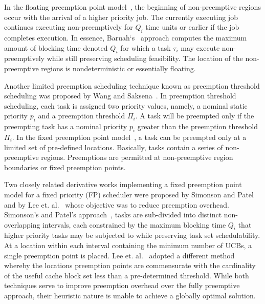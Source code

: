 In the floating preemption point model~\cite{baruah:05}, the beginning of non-preemptive regions occur with the arrival of a higher priority job.  The currently executing job continues executing non-preemptively for \begin{math}Q_{i}\end{math} time units or earlier if the job completes execution. In essence, Baruah`s~\cite{baruah:05} approach computes the maximum amount of blocking time denoted \begin{math}Q_{i}\end{math} for which a task \begin{math}\tau_{i}\end{math} may execute non-preemptively while still preserving scheduling feasibility. The location of the non-preemptive regions is nondeterministic or essentially floating.

Another limited preemption scheduling technique known as preemption threshold scheduling was proposed by Wang and Saksena~\cite{wang:99}.  In preemption threshold scheduling, each task is assigned two priority values, namely, a nominal static priority \begin{math}p_{i}\end{math} and a preemption threshold \begin{math}\Pi_{i}\end{math}.  A task will be preempted only if the preempting task has a nominal priority \begin{math}p_{i}\end{math} greater than the preemption threshold \begin{math}\Pi_{i}\end{math}. In the fixed preemption point model~\cite{burns:05}, a task can be preempted only at a limited set of pre-defined locations. Basically, tasks contain a series of non-preemptive regions.  Preemptions are permitted at non-preemptive region boundaries or fixed preemption points.

Two closely related derivative works implementing a fixed preemption point model for a fixed priority (FP) scheduler were proposed by Simonson and Patel~\cite{simonson:95} and by Lee et. al.~\cite{lee:98} whose objective was to reduce preemption overhead.  Simonson’s and Patel’s approach~\cite{simonson:95}, tasks are sub-divided into distinct non-overlapping intervals, each constrained by the maximum blocking time \begin{math}Q_{i}\end{math} that higher priority tasks may be subjected to while preserving task set schedulability.  At a location within each interval containing the minimum number of UCBs, a single preemption point is placed.  Lee et. al.~\cite{lee:98} adopted a different method whereby the locations preemption points are commensurate with the cardinality of the useful cache block set less than a pre-determined threshold.   While both techniques serve to improve preemption overhead over the fully preemptive approach, their heuristic nature is unable to achieve a globally optimal solution.

